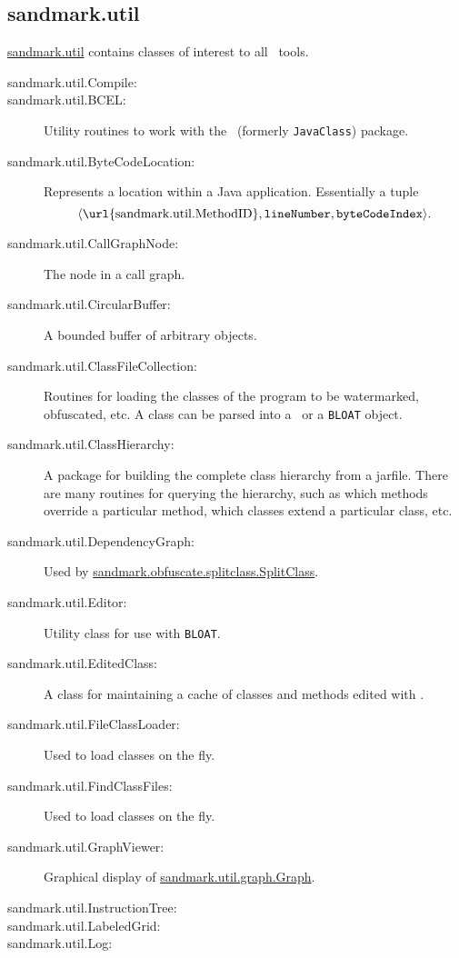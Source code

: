 \subsection{sandmark.util}
\url{sandmark.util} contains classes of interest
to all \SM\ tools.
\begin{description}
   \item[sandmark.util.Compile:]
   \item[sandmark.util.BCEL:]
      Utility routines to work with the \BCEL\ (formerly {\tt JavaClass})
      package.
   \item[sandmark.util.ByteCodeLocation:]
      Represents a location within a Java application.
      Essentially a tuple 
      $$\langle \mbox{\url{sandmark.util.MethodID}}, {\tt lineNumber}, {\tt byteCodeIndex}\rangle.$$
   \item[sandmark.util.CallGraphNode:]
      The node in a call graph.
   \item[sandmark.util.CircularBuffer:]
      A bounded buffer of arbitrary objects.
   \item[sandmark.util.ClassFileCollection:]
      Routines for loading the classes of the
      program to be watermarked, obfuscated, etc.
      A class can be parsed into a \BCEL\ or a {\tt BLOAT} object.
   \item[sandmark.util.ClassHierarchy:]
      A package for building the complete class hierarchy
      from a jarfile. There are many routines for querying the
      hierarchy, such as which methods override a particular
      method, which classes extend a particular class, etc.
   \item[sandmark.util.DependencyGraph:]
      Used by \url{sandmark.obfuscate.splitclass.SplitClass}.
   \item[sandmark.util.Editor:]
      Utility class for use with {\tt BLOAT}.
   \item[sandmark.util.EditedClass:]
      A class for maintaining a cache of classes and methods
      edited with \BCEL.
   \item[sandmark.util.FileClassLoader:]
      Used to load classes on the fly.
   \item[sandmark.util.FindClassFiles:]
      Used to load classes on the fly.
   \item[sandmark.util.GraphViewer:]
      Graphical display of \url{sandmark.util.graph.Graph}.
   \item[sandmark.util.InstructionTree:]
   \item[sandmark.util.LabeledGrid:]
   \item[sandmark.util.Log:]

\end{description}
